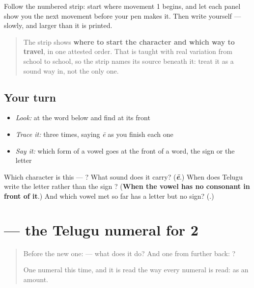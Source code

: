 Follow the numbered strip: start where movement 1 begins, and let each panel show you the next movement before your pen makes it. Then write  yourself — slowly, and larger than it is printed.

\begin{quote}
The strip shows \textbf{where to start the character and which way to travel}, in one attested order. That is taught with real variation from school to school, so the strip names its source beneath it: treat it as a sound way in, not the only one.
\end{quote}

\subsection*{Your turn}
\begin{itemize}
\raggedright
  \item \emph{Look:} at the word below and find  at its front
\end{itemize}

\begin{quote}
\end{quote}

\begin{itemize}
\raggedright
  \item \emph{Trace it:}  three times, saying \emph{ē} as you finish each one
  \item \emph{Say it:} which form of a vowel goes at the front of a word, the sign or the letter
\end{itemize}

\begin{tcolorbox}[breakable,colback=teal!4,colframe=teal!35!black,title={Before you move on}]
Which character is this — ? What sound does it carry? (\emph{\textbf{ē}}.) When does Telugu write the letter  rather than the sign ? (\textbf{When the vowel has no consonant in front of it}.) And which vowel met so far has a letter but no sign? (\textbf{}.)
\end{tcolorbox}
\section[\texorpdfstring{\te{౨} (2)}{౨ (2)}]{ — the Telugu numeral for 2}

\label{lesson:TE-S141-digit-2}



\begin{quote}
Before the new one:  — what does it do? And one from further back: ?

One numeral this time, and it is read the way every numeral is read: as an amount.
\end{quote}

